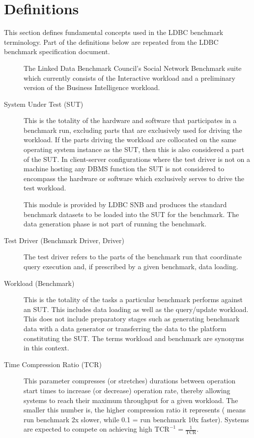 \chapter*{Definitions}

This section defines fundamental concepts used in the LDBC benchmark terminology. Part of the definitions below are repeated from the LDBC benchmark specification document.

\begin{description}
    \item[\ldbcsnb] The Linked Data Benchmark Council's Social Network Benchmark suite which currently consists of the Interactive workload and a preliminary version of the Business Intelligence workload.
    
    \item[System Under Test (SUT)] This is the totality of the hardware and software that participates in a benchmark run, excluding parts that are exclusively used for driving the workload. If the parts driving the workload are collocated on the same operating system instance as the SUT, then this is also considered a part of the SUT. In client-server configurations where the test driver is not on a machine hosting any DBMS function the SUT is not considered to encompass the hardware or software which exclusively serves to drive the test workload.
    
    \item[\datagen] This module is provided by LDBC SNB and produces the standard benchmark datasets to be loaded into the SUT for the benchmark. The data generation phase is not part of running the benchmark.
 
    \item[Test Driver (Benchmark Driver, Driver)] The test driver refers to the parts of the benchmark run that coordinate query execution and, if prescribed by a given benchmark, data loading.
    
    \item[Workload (Benchmark)] This is the totality of the tasks a particular benchmark performs against an SUT. This includes data loading as well as the query/update workload. This does not include preparatory stages such as generating benchmark data with a data generator or transferring the data to the platform constituting the SUT. 
    The terms workload and benchmark are synonyms in this context. 

    \item[Time Compression Ratio (TCR)]
    This parameter compresses (or stretches) durations between operation start times to increase (or decrease) operation rate, thereby allowing systems to reach their maximum throughput for a given workload. The smaller this number is, the higher compression ratio it represents ( means run benchmark 2x slower, while 0.1 = run benchmark 10x faster). Systems are expected to compete on achieving high $\text{TCR}^{-1}=\frac{1}{\text{TCR}}$.
    

\end{description}
